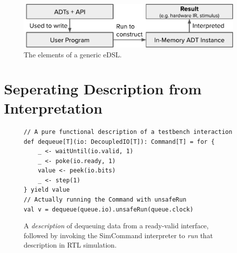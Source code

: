 \documentclass[sigplan,review,nonacm,9pt]{acmart}
\begin{document}

\maketitle

\vspace{-0.5cm}
\begin{figure}[h]
\includegraphics[width=\linewidth]{simcommand/functional_apis.pdf}
\caption{The elements of a generic eDSL.}
\label{fig:functional_apis}
\end{figure}
\vspace{-0.5cm}

\section{Seperating Description from Interpretation}


\begin{figure}[t]
  \begin{verbatim}
// A pure functional description of a testbench interaction
def dequeue[T](io: DecoupledIO[T]): Command[T] = for {
    _ <- waitUntil(io.valid, 1)
    _ <- poke(io.ready, 1)
    value <- peek(io.bits)
    _ <- step(1)
} yield value
// Actually running the Command with unsafeRun
val v = dequeue(queue.io).unsafeRun(queue.clock)
  \end{verbatim}
  \vspace{-4mm}
  \caption{A \textit{description} of dequeuing data from a ready-valid interface, followed by invoking the SimCommand interpreter to \textit{run} that description in RTL simulation.}
  \label{fig:simcommand}
  \vspace{-4.5mm}
  \end{figure}
\end{document}
